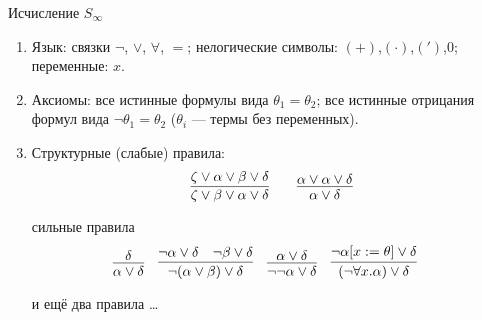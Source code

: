 \documentclass[aspectratio=169]{beamer}
\newtheorem{lmm}{Лемма}[section]
\begin{document}

%

\begin{frame}{Исчисление $S_\infty$}
\begin{enumerate}
\item Язык: связки $\neg$, $\vee$, $\forall$, $=$; нелогические символы: $(+)$,$(\cdot)$,$(')$,$0$; переменные: $x$.
\item Аксиомы: все истинные формулы вида $\theta_1=\theta_2$; все истинные отрицания формул вида $\neg\theta_1=\theta_2$
($\theta_i$ --- термы без переменных).
\item Структурные (слабые) правила:
$$\infer{\zeta\vee\beta\vee\alpha\vee\delta}{\zeta\vee\alpha\vee\beta\vee\delta} \quad\quad
\infer{\alpha\vee\delta}{\alpha\vee\alpha\vee\delta}$$

сильные правила
$$\infer{\alpha\vee\delta}{\delta}\quad
\infer{\neg(\alpha\vee\beta)\vee\delta}{\neg\alpha\vee\delta\quad\neg\beta\vee\delta}\quad
\infer{\neg\neg\alpha\vee\delta}{\alpha\vee\delta}\quad
\infer{(\neg\forall x.\alpha)\vee\delta}{\neg\alpha[x := \theta]\vee\delta}\quad$$

и ещё два правила \dots
\end{enumerate}
\end{frame}
\end{document}
